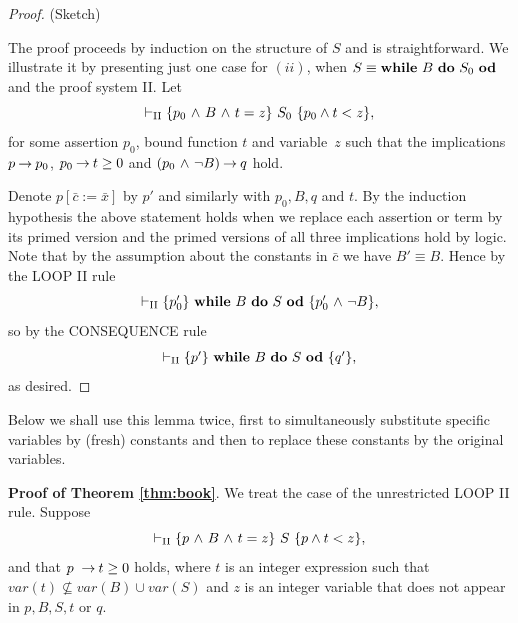 \documentclass[runningheads]{llncs}       %
\begin{document}
\begin{proof}
  (Sketch)

\NI
The proof proceeds by induction on the structure of $S$ and is straightforward. We illustrate it by presenting
just one case for $(ii)$, when
$S \equiv \mbox{$\mbox{{\bf while}\ } {B}\ \mbox{{\bf do}\ } {S_0}\ \mbox{{\bf od}}$}$ and the proof system II. 
Let 
\[
 \vdash_{\rm{II}} \mbox{$\{{p_{0} \mbox{$\ \wedge\ $} B \mbox{$\ \wedge\ $} t = z}\}\ {S_0}\ \{{p_0\wedge  t < z}\}$},
\]
for some assertion $p_{0}$,  bound function $t$ and
variable~$z$ such that
the implications
$p \mbox{$\:\rightarrow\:$} p_{0}$, $p_{0} \mbox{$\:\rightarrow\:$} t \ge 0$ and  $(p_{0} \mbox{$\ \wedge\ $} \neg B) \mbox{$\:\rightarrow\:$} q$
hold.

Denote $p[\bar{c} := \bar{x}]$ by $p'$ and similarly with
$p_{0}, B, q$ and $t$.  By the induction hypothesis the above 
statement holds when we replace each assertion or term by its primed
version and the primed versions of all three implications hold by
logic.  Note that by the assumption about the constants in $\bar{c}$
we have $B' \equiv B$.  Hence by the LOOP II rule
\[
  \vdash_{\rm II} \mbox{$\{{p'_{0}}\}\ {\mbox{$\mbox{{\bf while}\ } {B}\ \mbox{{\bf do}\ } {S}\ \mbox{{\bf od}}$}}\ \{{p'_{0} \mbox{$\ \wedge\ $} \neg B}\}$},
\]
so by the CONSEQUENCE rule
\[
  \vdash_{\rm II} \mbox{$\{{p'}\}\ {\mbox{$\mbox{{\bf while}\ } {B}\ \mbox{{\bf do}\ } {S}\ \mbox{{\bf od}}$}}\ \{{q'}\}$},
\]
as desired.
\end{proof}

Below we shall use this lemma twice, first to simultaneously
substitute specific variables by (fresh) constants and then to
replace these constants by the original variables.
\III

\NI
\textbf{Proof of Theorem \ref{thm:book}}.
We treat the case of the unrestricted LOOP II rule.
Suppose
\[
  \vdash_{\rm{II}}  \mbox{$\{{p \mbox{$\ \wedge\ $} B \mbox{$\ \wedge\ $} t=z}\}\ {S}\ \{{p\wedge t<z}\}$},
\]
and that
$p\ \mbox{$\:\rightarrow\:$} t \geq 0$ holds,
where $t$ is an integer expression such that
$var(t) \not\subseteq var(B) \cup var(S)$ and $z$ is an integer variable
that does not appear in $p,B,S, t$ or $q$.

\end{document}
